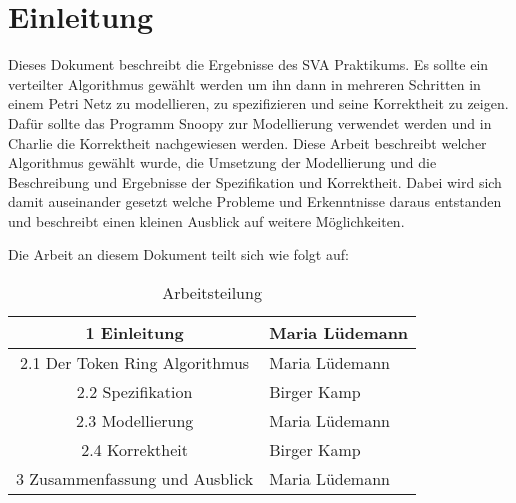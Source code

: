 \newpage
\section{Einleitung} 
Dieses Dokument beschreibt die Ergebnisse des SVA Praktikums. Es sollte ein verteilter Algorithmus gewählt werden um ihn dann in mehreren Schritten in einem Petri Netz zu modellieren, zu spezifizieren und seine Korrektheit zu zeigen. Dafür sollte das Programm Snoopy zur Modellierung verwendet werden und in Charlie die Korrektheit nachgewiesen werden. Diese Arbeit beschreibt welcher Algorithmus gewählt wurde, die Umsetzung der Modellierung und die Beschreibung und Ergebnisse der Spezifikation und Korrektheit.
Dabei wird sich damit auseinander gesetzt welche Probleme und Erkenntnisse daraus entstanden und beschreibt einen kleinen Ausblick auf weitere Möglichkeiten.

Die Arbeit an diesem Dokument teilt sich wie folgt auf:

\begin{table}[H]
\centering
 \begin{tabular}{|c|l|}
 \hline
 	1 Einleitung & Maria Lüdemann\\
 \hline
	2.1 Der Token Ring Algorithmus & Maria Lüdemann\\
 \hline
	2.2 Spezifikation & Birger Kamp\\
 \hline
	2.3 Modellierung & Maria Lüdemann\\
 \hline
	2.4 Korrektheit & Birger Kamp\\
 \hline
	3 Zusammenfassung und Ausblick & Maria Lüdemann\\
 \hline		 
 
 \end{tabular}
\caption{Arbeitsteilung}
\end{table}